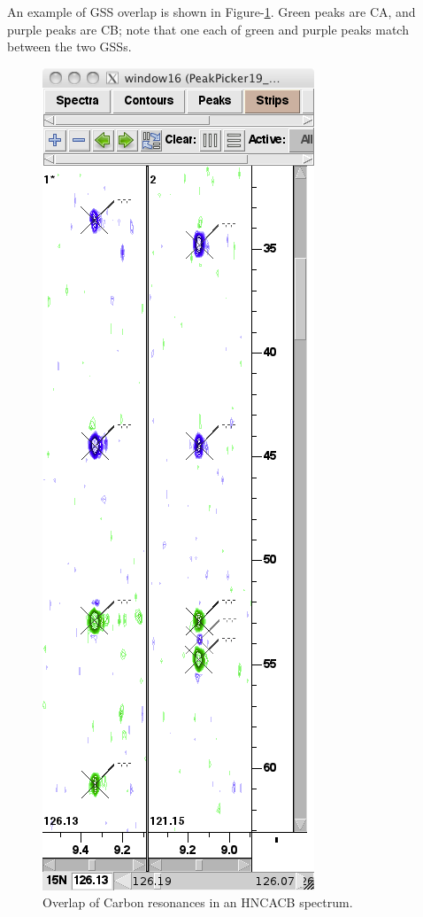 An example of GSS overlap is shown in Figure-\ref{hncacb_overlap}.  Green peaks
are CA, and purple peaks are CB; note that one each of green and purple peaks
match between the two GSSs.
\begin{figure}
  \includegraphics[scale=0.35]{figures/hncacb_overlap}
  \caption{Overlap of Carbon resonances in an HNCACB spectrum.}
  \label{hncacb_overlap}
\end{figure}



